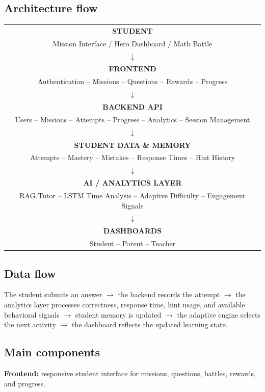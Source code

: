 \documentclass[11pt]{article}
\begin{document}
\subsection{Architecture flow}
\begin{center}
\begin{tabular}{c}
\textbf{STUDENT} \\
Mission Interface / Hero Dashboard / Math Battle \\
$\downarrow$ \\[4pt]
\textbf{FRONTEND} \\
Authentication -- Missions -- Questions -- Rewards -- Progress \\
$\downarrow$ \\[4pt]
\textbf{BACKEND API} \\
Users -- Missions -- Attempts -- Progress -- Analytics -- Session Management \\
$\downarrow$ \\[4pt]
\textbf{STUDENT DATA \& MEMORY} \\
Attempts -- Mastery -- Mistakes -- Response Times -- Hint History \\
$\downarrow$ \\[4pt]
\textbf{AI / ANALYTICS LAYER} \\
RAG Tutor -- LSTM Time Analysis -- Adaptive Difficulty -- Engagement Signals \\
$\downarrow$ \\[4pt]
\textbf{DASHBOARDS} \\
Student -- Parent -- Teacher \\
\end{tabular}
\end{center}

\subsection{Data flow}
The student submits an answer $\rightarrow$ the backend records the attempt $\rightarrow$ the analytics layer processes correctness, response time, hint usage, and available behavioral signals $\rightarrow$ student memory is updated $\rightarrow$ the adaptive engine selects the next activity $\rightarrow$ the dashboard reflects the updated learning state.

\subsection{Main components}
\textbf{Frontend:} responsive student interface for missions, questions, battles, rewards, and progress.
\end{document}

